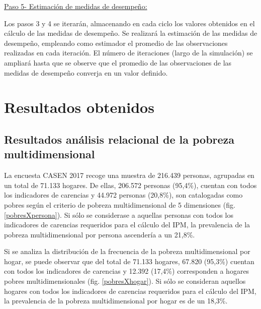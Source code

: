 \documentclass[12pt,letterpaper,spanish]{article}
\begin{document}
\begin{enumerate}
\underline{Paso 5- Estimación de medidas de desempeño:} 

Los pasos 3 y 4 se iterarán, almacenando en cada ciclo los valores obtenidos en el cálculo de las medidas de desempeño. Se realizará la estimación de las medidas de desempeño, empleando como estimador el promedio de las observaciones realizadas en cada iteración. El número de iteraciones (largo de la simulación) se ampliará hasta que se observe que el promedio de las observaciones de las medidas de desempeño converja en un valor definido. 

   
 
    
    
   

    
    
    
    

    
    
\end{enumerate}













\newpage
\section{Resultados obtenidos} %




\subsection{Resultados análisis relacional de la pobreza multidimensional}

La encuesta CASEN 2017 recoge una muestra de 216.439 personas, agrupadas en un total de 71.133 hogares. De ellas, 206.572 personas (95,4\%), cuentan con todos los indicadores de carencias y 44.972 personas (20,8\%), son catalogadas como pobres según el criterio de pobreza multidimensional de 5 dimensiones (fig. \ref{pobresXpersona}). Si sólo se considerase a aquellas personas con todos los indicadores de carencias requeridos para el cálculo del IPM, la prevalencia de la pobreza multidimensional por persona ascendería a un 21,8\%.

Si se analiza la distribución de la frecuencia de la pobreza multidimensional por hogar, se puede observar que del total de 71.133 hogares, 67.820 (95,3\%) cuentan con todos los indicadores de carencias y 12.392 (17,4\%) corresponden a hogares pobres multidimensionales (fig. \ref{pobresXhogar}). Si sólo se consideran aquellos hogares con todos los indicadores de carencias requeridos para el cálculo del IPM, la prevalencia de la pobreza multidimensional por hogar es de un 18,3\%.
\end{document}
